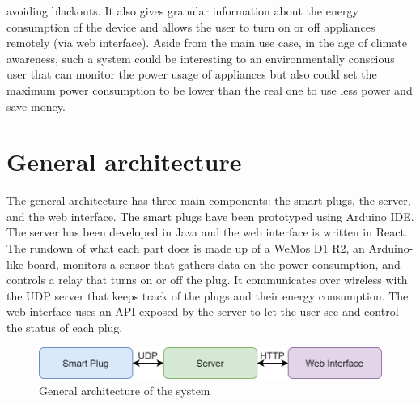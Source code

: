 \documentclass[conference]{IEEEtran}
\begin{document}
avoiding blackouts. It also gives granular information about the energy consumption of the device and allows the user to turn on or off appliances remotely (via web interface). Aside from the main use case, in the age of climate awareness, such a system could be interesting to an environmentally conscious user that can monitor the power usage of appliances but also could set the maximum power consumption to be lower than the real one to use less power and save money. 
	
	\section{General architecture}
	The general architecture has three main components: the smart plugs, the server, and the web interface. The smart plugs have been prototyped using Arduino IDE. The server has been developed in Java and the web interface is written in React. The rundown of what each part does is made up of a WeMos D1 R2, an Arduino-like board, monitors a sensor that gathers data on the power consumption, and controls a relay that turns on or off the plug. It communicates over wireless with the UDP server that keeps track of the plugs and their energy consumption. The web interface uses an API exposed by the server to let the user see and control the status of each plug.
	\begin{figure}[htbp]
		\centering
		\includegraphics[width=\linewidth]{assets/architecture_schema}
		\caption{General architecture of the system}
		\label{fig:architecture_schema}
	\end{figure}
	
\end{document}
